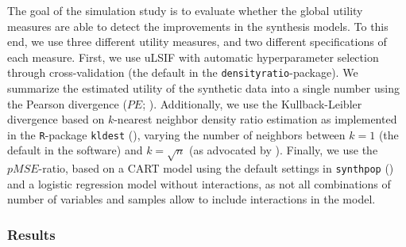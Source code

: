 \documentclass[
]{article}
\begin{document}
The goal of the simulation study is to evaluate whether the global
utility measures are able to detect the improvements in the synthesis
models. To this end, we use three different utility measures, and two
different specifications of each measure. First, we use uLSIF with
automatic hyperparameter selection through cross-validation (the default
in the \texttt{densityratio}-package). We summarize the estimated
utility of the synthetic data into a single number using the Pearson
divergence (\(PE\); ). Additionally, we use the Kullback-Leibler divergence
based on \(k\)-nearest neighbor density ratio estimation as implemented
in the \texttt{R}-package \texttt{kldest} (), varying the number of neighbors between \(k = 1\) (the default
in the software) and \(k = \sqrt{n}\) (as advocated by
). Finally, we use the \(pMSE\)-ratio, based on a CART
model using the default settings in \texttt{synthpop}
() and a logistic
regression model without interactions, as not all combinations of number
of variables and samples allow to include interactions in the model.

\subsubsection{Results}\label{results}

\linespread{1}
\end{document}
